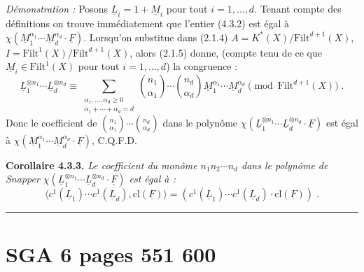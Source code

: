 \textit{D\'emonstration :} Posons $\underline{L}_i = 1 + \underline{M}_i$ pour tout $i = 1, \ldots, d$.
Tenant compte des d\'efinitions on trouve imm\'ediatement que l'entier (4.3.2) est \'egal \`a $\chi(\underline{M}_1^{\alpha_1} \cdots \underline{M}_d^{\alpha_d} \cdot \underline{F})$. Lorsqu'on substitue dans (2.1.4) $A = K^*(X)/\mathrm{Filt}^{d+1}(X)$, $I = \mathrm{Filt}^1(X)/\mathrm{Filt}^{d+1}(X)$, alors (2.1.5) donne, (compte tenu de ce que $\underline{M}_i \in \mathrm{Filt}^1(X)$ pour tout $i = 1, \ldots, d$) la congruence :
\begin{equation}\tag{4.3.5}
\underline{L}_1^{\otimes n_1} \cdots \underline{L}_d^{\otimes n_d} \equiv \sum_{\substack{\alpha_1, \ldots, \alpha_d \geq 0\\\alpha_1 + \cdots + \alpha_d = d}} \binom{n_1}{\alpha_1} \cdots \binom{n_d}{\alpha_d} \underline{M}_1^{\alpha_1} \cdots \underline{M}_d^{\alpha_d} \pmod{\mathrm{Filt}^{d+1}(X)}\;.
\end{equation}
Donc le coefficient de $\binom{n_1}{\alpha_1} \cdots \binom{n_d}{\alpha_d}$ dans le polyn\^ome $\chi(\underline{L}_1^{\otimes n_1} \cdots \underline{L}_d^{\otimes n_d} \cdot \underline{F})$ est \'egal \`a $\chi(\underline{M}_1^{\alpha_1} \cdots \underline{M}_d^{\alpha_d} \cdot \underline{F})$, C.Q.F.D.

\smallskip
\noindent\textbf{Corollaire 4.3.3.} \textit{Le coefficient du mon\^ome $n_1 n_2 \cdots n_d$ dans le polyn\^ome de Snapper $\chi(\underline{L}_1^{\otimes n_1} \cdots \underline{L}_d^{\otimes n_d} \cdot \underline{F})$ est \'egal \`a :
\begin{equation}\tag{4.3.4}
\langle c^1(\underline{L}_1) \cdots c^1(\underline{L}_d), \mathrm{cl}(\underline{F}) \rangle = (c^1(\underline{L}_1) \cdots c^1(\underline{L}_d) \cdot \mathrm{cl}(\underline{F}))\;.
\end{equation}}

\vfill
\begin{center}
\rule{5cm}{0.4pt}
\end{center}


\clearpage
{}
\section*{SGA 6 pages 551 600}
\setcounter{page}{551}

\vspace{-1cm}


